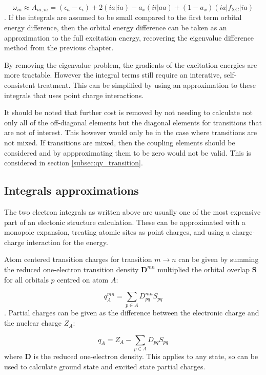 \begin{equation}
\omega_{ia} \approx A_{ia, ia} = \left( \epsilon_a - \epsilon_i \right) + 2\left(ia|ia\right) - a_x\left(ii|aa\right) + (1- a_x)\left(ia|f_{\text{XC}}|ia\right) 
\label{eq:diag_dom}
\end{equation}
%
. If the integrals are assumed to be small compared to the first term orbital energy
difference, then the orbital energy difference can be taken as an approximation 
to the full excitation energy, recovering the eigenvalue difference method from
the previous chapter.

By removing the eigenvalue problem, the gradients of the excitation energies are
more tractable. However the integral terms still require an interative, self-consistent
treatment. This can be simplified by using an approximation to these integrals that
uses point charge interactions.

It should be noted that further cost is removed by not needing to calculate not
only all of the off-diagonal elements but the diagonal elements for transitions
that are not of interest. This however would only be in the case where transitions
are not mixed. If transitions are mixed, then the coupling elements should be considered
and by appproximating them to be zero would not be valid. This is considered in
section \ref{subsec:qy_transition}.

\subsection{Integrals approximations}
\label{subsec:MNOK}

The two electron integrals as written above are usually one of the most expensive
part of an electonic structure calculation. These can be approximated with a monopole
expansion, treating atomic sites as point charges, and using a charge-charge interaction 
for the energy.

Atom centered transition charges for transition $m \rightarrow n$ can be given
by summing the reduced one-electron transition density $\mathbf{D}^{mn}$ multiplied
the orbital overlap $\mathbf{S}$ for all orbitals $p$ centred on atom $A$:

\begin{equation}
q^{mn}_A = \sum_{p \in A} D^{mn}_{pq} S_{pq}  
\end{equation}
%
. Partial charges can be given as the difference between the electronic charge
and the nuclear charge $Z_A$:

\begin{equation}
q_A = Z_A - \sum_{p \in A} D_{pq} S_{pq}  
\end{equation}
%
where $\mathbf{D}$ is the reduced one-electron density. This applies to any state,
so can be used to calculate ground state and excited state partial charges.

